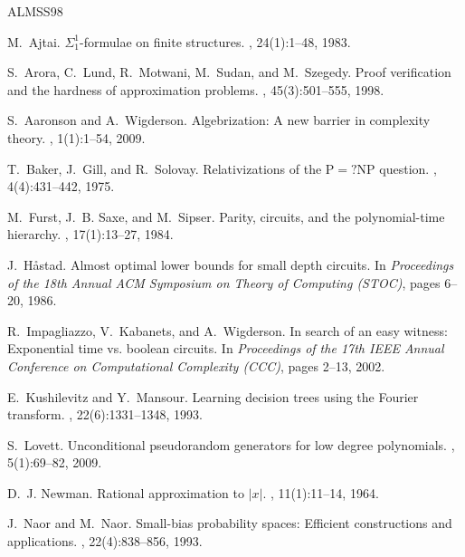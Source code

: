 \documentclass[11pt,letterpaper]{article}
\begin{document}

\begin{thebibliography}{ALMSS98}

M.~Ajtai.
\newblock $\Sigma_1^1$-formulae on finite structures.
, 24(1):1--48, 1983.

S.~Arora, C.~Lund, R.~Motwani, M.~Sudan, and M.~Szegedy.
\newblock Proof verification and the hardness of approximation problems.
, 45(3):501--555, 1998.

S.~Aaronson and A.~Wigderson.
\newblock Algebrization: A new barrier in complexity theory.
, 1(1):1--54, 2009.

T.~Baker, J.~Gill, and R.~Solovay.
\newblock Relativizations of the $\mathrm{P} =? \mathrm{NP}$ question.
, 4(4):431--442, 1975.

M.~Furst, J.~B. Saxe, and M.~Sipser.
\newblock Parity, circuits, and the polynomial-time hierarchy.
, 17(1):13--27, 1984.

J.~H{\aa}stad.
\newblock Almost optimal lower bounds for small depth circuits.
\newblock In {\em Proceedings of the 18th Annual ACM Symposium on Theory of Computing (STOC)}, pages 6--20, 1986.

R.~Impagliazzo, V.~Kabanets, and A.~Wigderson.
\newblock In search of an easy witness: Exponential time vs. boolean circuits.
\newblock In {\em Proceedings of the 17th IEEE Annual Conference on Computational Complexity (CCC)}, pages 2--13, 2002.

E.~Kushilevitz and Y.~Mansour.
\newblock Learning decision trees using the {F}ourier transform.
, 22(6):1331--1348, 1993.

S.~Lovett.
\newblock Unconditional pseudorandom generators for low degree polynomials.
, 5(1):69--82, 2009.

D.~J. Newman.
\newblock Rational approximation to $|x|$.
, 11(1):11--14, 1964.

J.~Naor and M.~Naor.
\newblock Small-bias probability spaces: Efficient constructions and applications.
, 22(4):838--856, 1993.


\end{thebibliography}
\end{document}
